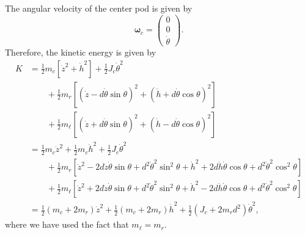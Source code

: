 The angular velocity of the center pod is given by
\[
\boldsymbol{\omega}_c = \begin{pmatrix} 0 \\ 0 \\ \dot{\theta} \end{pmatrix}.
\]
Therefore, the kinetic energy is given by
\begin{align*}
K &= \frac{1}{2}m_c \left[\dot{z}^2 + \dot{h}^2\right] 
+ \frac{1}{2} J_c \dot{\theta}^2 
\\ &\qquad
+ \frac{1}{2}m_r \left[ (\dot{z}-d\dot{\theta}\sin\theta)^2 + (\dot{h} + d\dot{\theta}\cos\theta)^2 \right] 
\\ &\qquad
+ \frac{1}{2}m_\ell \left[ (\dot{z}+d\dot{\theta}\sin\theta)^2 + (\dot{h}-d\dot{\theta}\cos\theta)^2 \right] 
\\
&= \frac{1}{2} m_c \dot{z}^2 + \frac{1}{2}m_c \dot{h}^2 + \frac{1}{2} J_c \dot{\theta}^2
\\ &\qquad
+ \frac{1}{2}m_r \left[ \dot{z}^2-2d\dot{z}\dot{\theta}\sin\theta + d^2\dot{\theta}^2\sin^2\theta + \dot{h}^2 + 2d\dot{h}\dot{\theta}\cos\theta + d^2\dot{\theta}^2\cos^2\theta \right] 
\\ &\qquad
+ \frac{1}{2}m_\ell \left[ \dot{z}^2+2d\dot{z}\dot{\theta}\sin\theta + d^2\dot{\theta}^2\sin^2\theta + \dot{h}^2 - 2d\dot{h}\dot{\theta}\cos\theta + d^2\dot{\theta}^2\cos^2\theta \right] 
\\
&= \frac{1}{2} (m_c+2m_r) \dot{z}^2 + \frac{1}{2}(m_c+2m_r) \dot{h}^2 + \frac{1}{2} (J_c+2m_rd^2) \dot{\theta}^2,
\end{align*}
where we have used the fact that $m_\ell=m_r$.



